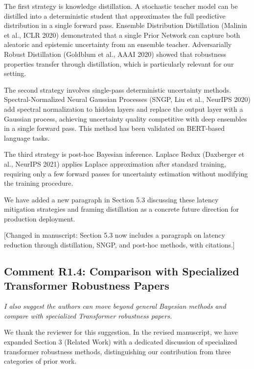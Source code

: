\documentclass[12pt,a4paper]{article}
\newcommand{\reviewertext}[1]{\textcolor{reviewercolor}{\textit{#1}}}
\newcommand{\response}[1]{\textcolor{responsecolor}{#1}}
\newcommand{\changed}[1]{\textcolor{changecolor}{[Changed in manuscript: #1]}}
\begin{document}
\response{The first strategy is knowledge distillation. A stochastic teacher model can be distilled into a deterministic student that approximates the full predictive distribution in a single forward pass. Ensemble Distribution Distillation (Malinin et al., ICLR 2020) demonstrated that a single Prior Network can capture both aleatoric and epistemic uncertainty from an ensemble teacher. Adversarially Robust Distillation (Goldblum et al., AAAI 2020) showed that robustness properties transfer through distillation, which is particularly relevant for our setting.}

\response{The second strategy involves single-pass deterministic uncertainty methods. Spectral-Normalized Neural Gaussian Processes (SNGP, Liu et al., NeurIPS 2020) add spectral normalization to hidden layers and replace the output layer with a Gaussian process, achieving uncertainty quality competitive with deep ensembles in a single forward pass. This method has been validated on BERT-based language tasks.}

\response{The third strategy is post-hoc Bayesian inference. Laplace Redux (Daxberger et al., NeurIPS 2021) applies Laplace approximation after standard training, requiring only a few forward passes for uncertainty estimation without modifying the training procedure.}

\response{We have added a new paragraph in Section 5.3 discussing these latency mitigation strategies and framing distillation as a concrete future direction for production deployment.}

\changed{Section 5.3 now includes a paragraph on latency reduction through distillation, SNGP, and post-hoc methods, with citations.}

\bigskip

\subsection*{Comment R1.4: Comparison with Specialized Transformer Robustness Papers}

\reviewertext{I also suggest the authors can move beyond general Bayesian methods and compare with specialized Transformer robustness papers.}

\bigskip

\response{We thank the reviewer for this suggestion. In the revised manuscript, we have expanded Section 3 (Related Work) with a dedicated discussion of specialized transformer robustness methods, distinguishing our contribution from three categories of prior work.}
\end{document}
